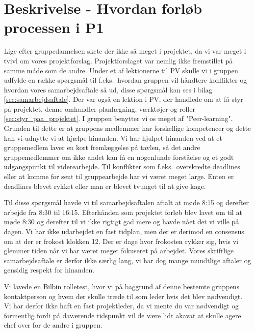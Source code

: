 \documentclass[oneside,a4paper,titlepage]{article}
\begin{document}
\section{Beskrivelse - Hvordan forløb processen i P1}

Lige efter gruppedannelsen skete der ikke så meget i projektet, da vi var meget i tvivl om vores projektforslag. Projektforslaget var nemlig ikke fremstillet på samme måde som de andre. Under et af lektionerne til PV skulle vi i gruppen udfylde en række spørgsmål til f.eks.\ hvordan gruppen vil håndtere konflikter og hvordan vores samarbejdsaftale så ud, disse spørgsmål kan ses i bilag \ref{sec:samarbejdsaftale}. Der var også en lektion i PV, der handlede om at få styr på projektet, denne omhandler planlægning, værktøjer og roller \ref{sec:styr_paa_projektet}.\newline
I gruppen benytter vi os meget af "Peer-learning". Grunden til dette er at gruppens medlemmer har forskellige kompetencer og dette kan vi udnytte vi at hjælpe hinanden. Vi har hjulpet hinanden ved at et gruppemedlem laver en kort fremlæggelse på tavlen, så det andre gruppemedlemmer om ikke andet kan få en nogenlunde forståelse og et godt udgangspunkt til viderearbejde.
Til konflikter som f.eks.\ overskredte deadlines eller at komme for sent til gruppearbejde har vi været meget large. Enten er deadlines blevet rykket eller man er blevet tvunget til at give kage. 

Til disse spørgsmål havde vi til samarbejdsaftalen aftalt at møde 8:15 og derefter arbejde fra 8:30 til 16:15. Efterhånden som projektet forløb blev lavet om til at møde 8:30 og derefter til vi ikke rigtigt gad mere og havde nået det vi ville på dagen. Vi har ikke udarbejdet en fast tidplan, men der er derimod en consensus om at der er frokost klokken 12. Der er dage hvor frokosten rykker sig, hvis vi glemmer tiden når vi har været meget fokuseret på arbejdet. Vores skriftlige samarbejdsaftale er derfor ikke særlig lang, vi har dog mange mundtlige aftaler og gensidig respekt for hinanden. 

Vi lavede en Bilbin rolletest, hvor vi på baggrund af denne bestemte gruppens kontaktperson og hvem der skulle træde til som leder hvis det blev nødvendigt. Vi har derfor ikke haft en fast projektleder, da vi mente du var nødvendigt og formentlig fordi på daværende tidspunkt vil de være lidt akavat at skulle agere chef over for de andre i gruppen.
\end{document}
